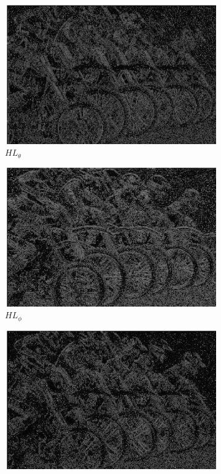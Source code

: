 \begin{figure}
\begin{subfigure}[b]{0.23\textwidth}
         \includegraphics[width=\textwidth]{./figs/o_2_1_1_q}
         \caption{$HL_{\theta}$}
         \label{fig:qwt10}
     \end{subfigure}
     \begin{subfigure}[b]{0.23\textwidth}
         \centering
         \includegraphics[width=\textwidth]{./figs/o_2_1_2_q}
         \caption{$HL_{\phi}$}
         \label{fig:qwt11}
     \end{subfigure}
     \begin{subfigure}[b]{0.23\textwidth}
         \centering
         \includegraphics[width=\textwidth]{./figs/o_2_1_3_q}

\end{subfigure}
\end{figure}
